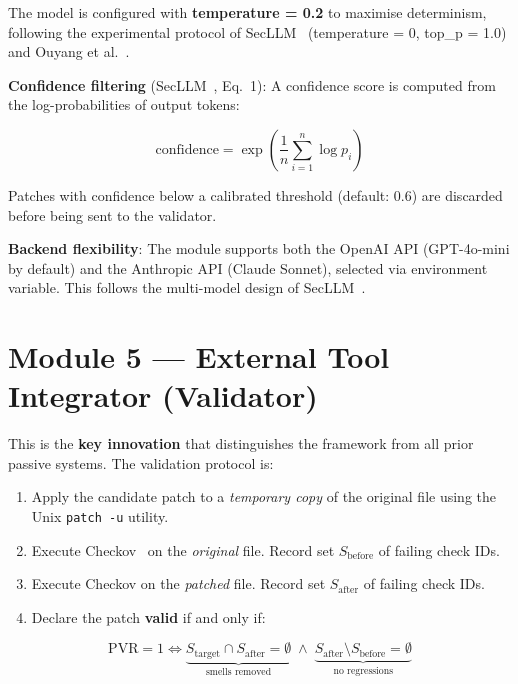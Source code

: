 \documentclass[12pt, a4paper]{report}
\begin{document}
The model is configured with \textbf{temperature = 0.2} to maximise determinism,
following the experimental protocol of SecLLM~\citep{devito2025secllm} (temperature = 0,
top\_p = 1.0) and Ouyang et al.~\citep{ouyang2025nondeterminism}.

\textbf{Confidence filtering} (SecLLM~\citep{devito2025secllm}, Eq.~1): A confidence
score is computed from the log-probabilities of output tokens:

\begin{equation}
  \text{confidence} = \exp\!\left(\frac{1}{n} \sum_{i=1}^{n} \log p_i\right)
  \label{eq:confidence}
\end{equation}

Patches with confidence below a calibrated threshold (default: 0.6) are discarded
before being sent to the validator.

\textbf{Backend flexibility}: The module supports both the OpenAI API
(GPT-4o-mini by default) and the Anthropic API (Claude Sonnet), selected via
environment variable. This follows the multi-model design of SecLLM~\citep{devito2025secllm}.

\section{Module 5 --- External Tool Integrator (Validator)}

This is the \textbf{key innovation} that distinguishes the framework from all prior
passive systems. The validation protocol is:

\begin{enumerate}
  \item Apply the candidate patch to a \emph{temporary copy} of the original file
  using the Unix \texttt{patch -u} utility.
  \item Execute Checkov~\citep{checkov2024} on the \emph{original} file.
        Record set $S_{\text{before}}$ of failing check IDs.
  \item Execute Checkov on the \emph{patched} file.
        Record set $S_{\text{after}}$ of failing check IDs.
  \item Declare the patch \textbf{valid} if and only if:
\end{enumerate}

\begin{equation}
  \text{PVR} = 1 \iff
  \underbrace{S_{\text{target}} \cap S_{\text{after}} = \emptyset}_{\text{smells removed}}
  \;\wedge\;
  \underbrace{S_{\text{after}} \setminus S_{\text{before}} = \emptyset}_{\text{no regressions}}
  \label{eq:pvr}
\end{equation}
\end{document}
